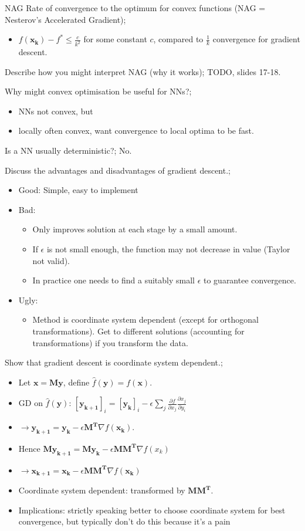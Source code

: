\documentclass{article}
\begin{document}
NAG Rate of convergence to the optimum for convex functions (NAG = Nesterov's Accelerated Gradient); \begin{itemize} \item $f(\mathbf{x_k})-f^*\leq \frac{c}{k^2}$ for some constant $c$, compared to $\frac{1}{k}$ convergence for gradient descent.  \end{itemize}

Describe how you might interpret NAG (why it works); TODO, slides 17-18.

Why might convex optimisation be useful for NNs?; \begin{itemize} \item NNs not convex, but \item locally often convex, want convergence to local optima to be fast.  \end{itemize}

Is a NN usually deterministic?; No.

Discuss the advantages and disadvantages of gradient descent.; \begin{itemize} \item Good: Simple, easy to implement \item Bad: \begin{itemize} \item Only improves solution at each stage by a small amount.  \item If $\epsilon$ is not small enough, the function may not decrease in value (Taylor not valid). \item In practice one needs to find a suitably small $\epsilon$ to guarantee convergence.  \end{itemize} \item Ugly: \begin{itemize} \item Method is coordinate system dependent (except for orthogonal transformations). Get to different solutions (accounting for transformations) if you transform the data.  \end{itemize} \end{itemize}

Show that gradient descent is coordinate system dependent.; \begin{itemize} \item Let $\mathbf{x=My}$, define $\hat{f}(\mathbf{y})=f(\mathbf{x})$.  \item GD on $\hat{f}(\mathbf{y})$: $[\mathbf{y_{k+1}}]_i = [\mathbf{y_k}]_i - \epsilon \sum_j \frac{\partial f}{\partial x_j}\frac{\partial x_j}{\partial y_i}$ \item $\rightarrow \mathbf{y_{k+1}} = \mathbf{y_k} - \epsilon \mathbf{M^T}\nabla f(\mathbf{x_k})$.  \item Hence $\mathbf{My_{k+1}=My_k}-\epsilon \mathbf{MM^T}\nabla f(x_k)$ \item $\rightarrow \mathbf{x_{k+1}}=\mathbf{x_k}-\epsilon\mathbf{MM^T}\nabla f(\mathbf{x_k})$ \item Coordinate system dependent: transformed by $\mathbf{MM^T}$.  \item Implications: strictly speaking better to choose coordinate system for best convergence, but typically don't do this because it's a pain \end{itemize} 
\end{document}
